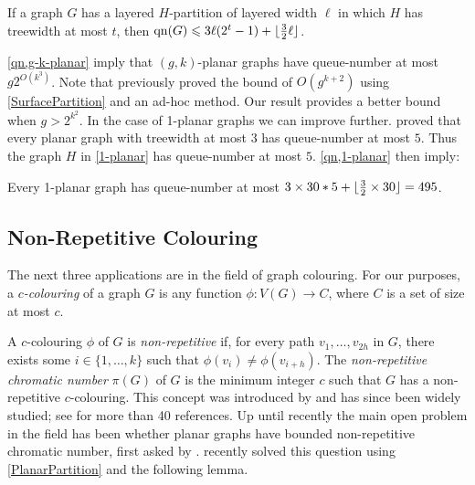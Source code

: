 \documentclass{patmorin}
\DeclareMathOperator{\qn}{qn}
\DeclarePairedDelimiter{\floor}{\lfloor}{\rfloor}
\renewcommand{\le}{\leqslant}
\renewcommand{\geq}{\geqslant}
\begin{document}
\begin{lem}
\label{qn}
If a graph $G$ has a layered $H$-partition of layered width $\ell$ in which $H$ has treewidth at most $t$, then $\qn(G)\le 3 \ell (2^t-1) + \floor{\tfrac{3}{2}\ell}$.
\end{lem}

\cref{qn,g-k-planar} imply that $(g,k)$-planar graphs have queue-number at most $g 2^{O(k^3)}$. 
Note that \citet{dujmovic.joret.ea:planar} previously proved the bound of 
$O(g^{k+2})$ using \cref{SurfacePartition} and an ad-hoc method. Our result provides a better bound when $g>2^{k^2}$. 
%
%
In the case of 1-planar graphs we can improve further. \citet{ABGKP18} proved that every planar graph with treewidth at most $3$ has queue-number at most $5$. Thus the graph $H$ in \cref{1-planar} has queue-number at most $5$. \cref{qn,1-planar} then imply:

\begin{prop}
Every 1-planar graph has queue-number at most $3 \times 30 * 5 + \floor{\tfrac{3}{2} \times 30} = 495$. \end{prop}


\subsection{Non-Repetitive Colouring}

The next three applications are in the field of graph colouring. For our purposes, a \emph{$c$-colouring} of a graph $G$ is any function $\phi\colon V(G)\to C$, where $C$ is a set of size at most $c$.

A $c$-colouring $\phi$ of $G$ is \emph{non-repetitive} if, for every path $v_1,\ldots,v_{2h}$ in $G$, there exists some $i\in\{1,\ldots,k\}$ such that $\phi(v_i)\neq\phi(v_{i+h})$.  The \emph{non-repetitive chromatic number} $\pi(G)$ of $G$ is the minimum integer $c$ such that $G$ has a non-repetitive $c$-colouring. This concept was introduced by \citet{AGHR-RSA02} and has since been widely studied; see \citep{dujmovic.esperet.ea:planar} for more than 40 references. Up until recently the main open problem in the field has been whether planar graphs have bounded non-repetitive chromatic number, first asked by \citet{AGHR-RSA02}. \citet{dujmovic.esperet.ea:planar} recently solved this question using \cref{PlanarPartition} and the following lemma.
\end{document}
